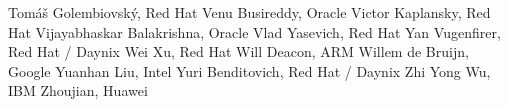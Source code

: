 Tomáš Golembiovský,	Red Hat	\newline
Venu Busireddy,	Oracle	\newline
Victor Kaplansky,	Red Hat	\newline
Vijayabhaskar Balakrishna,	Oracle	\newline
Vlad Yasevich,	Red Hat	\newline
Yan Vugenfirer, Red Hat / Daynix	\newline
Wei Xu,	Red Hat	\newline
Will Deacon,	ARM	\newline
Willem de Bruijn,	Google	\newline
Yuanhan Liu,	Intel	\newline
Yuri Benditovich,	Red Hat / Daynix	\newline
Zhi Yong Wu,	IBM	\newline
Zhoujian,	Huawei	\newline
